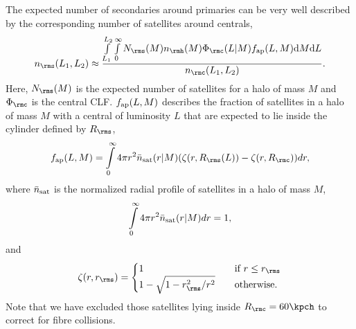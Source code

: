 \documentclass[fleqn,usenatbib,useAMS]{mnras}
\begin{document}
The expected number of secondaries around primaries can be very well described by the corresponding number of satellites around centrals,
\begin{equation}
n_\rms (L_1, L_2) \approx \frac{\int\limits_{L_1}^{L_2}\int\limits_0^\infty N_\rms (M) n_\rmh (M) \Phi_\rmc (L | M) f_{\rm ap} (L, M) \mathrm{d}M \mathrm{d}L}{n_\rmc (L_1, L_2)}.
\end{equation}
Here, $N_\rms (M)$ is the expected number of satellites for a halo of mass $M$ and $\Phi_\rmc$ is the central CLF. $f_{\rm ap} (L, M)$ describes the fraction of satellites in a halo of mass $M$ with a central of luminosity $L$ that are expected to lie inside the cylinder defined by $R_\rms$,
\begin{equation}
f_{\rm ap} (L, M) = \int\limits_0^\infty 4 \pi r^2 \bar{n}_{\rm sat} (r | M) (\zeta(r, R_\rms (L)) - \zeta(r, R_\rmc)) dr,
\label{eq:f_ap}
\end{equation}
where $\bar{n}_{\rm sat}$ is the normalized radial profile of satellites in a halo of mass $M$,
\begin{equation}
\int\limits_0^\infty 4 \pi r^2 \bar{n}_{\rm sat} (r | M) dr = 1,
\end{equation}
and
\begin{equation}
\zeta(r, r_\rms) = \begin{cases}
1 &\quad\text{if } r \leq r_\rms \\
1 - \sqrt{1 - r_\rms^2 / r^2} &\quad\text{otherwise.} \\ 
\end{cases}
\end{equation}
Note that we have excluded those satellites lying inside $R_\rmc = 60 \kpch$ to correct for fibre collisions.
\end{document}
